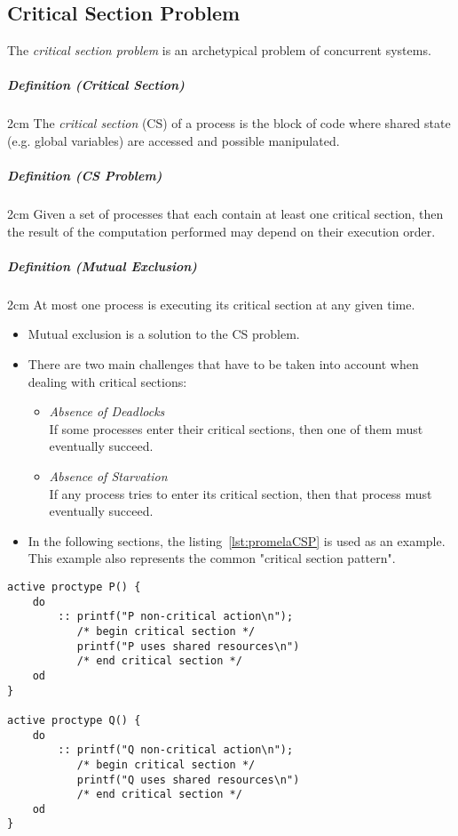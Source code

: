 \documentclass[a4paper, 11pt, accentcolor = tud3b]{tudreport}
\newcommand{\definition}[2]{\subparagraph{Definition (#1)} \begin{adjustwidth}{2cm}{} #2 \end{adjustwidth}}
\begin{document}
			\subsection{Critical Section Problem}
				The \textit{critical section problem} is an archetypical problem of concurrent systems.
				
				\definition{Critical Section}{The \textit{critical section} (CS) of a process is the block of code where shared state (e.g. global variables) are accessed and possible manipulated.}
				
				\definition{CS Problem}{Given a set of processes that each contain at least one critical section, then the result of the computation performed may depend on their execution order.}
				
				\definition{Mutual Exclusion}{At most one process is executing its critical section at any given time.}
				
				\begin{itemize}
					\item Mutual exclusion is a solution to the CS problem.
					\item There are two main challenges that have to be taken into account when dealing with critical sections:
						\begin{itemize}
							\item \textit{Absence of Deadlocks} \\ If some processes enter their critical sections, then one of them must eventually succeed.
							\item \textit{Absence of Starvation} \\ If any process tries to enter its critical section, then that process must eventually succeed.
						\end{itemize}
					\item In the following sections, the listing~\ref{lst:promelaCSP} is used as an example. This example also represents the common "critical section pattern".
				\end{itemize}
			
				\begin{lstlisting}[caption = { Critical Section Pattern in PROMELA }, label = lst:promelaCSP, language = PROMELA]
active proctype P() {
	do
		:: printf("P non-critical action\n");
		   /* begin critical section */
		   printf("P uses shared resources\n")
		   /* end critical section */
	od
}

active proctype Q() {
	do
		:: printf("Q non-critical action\n");
		   /* begin critical section */
		   printf("Q uses shared resources\n")
		   /* end critical section */
	od
}
				\end{lstlisting}
\end{document}
